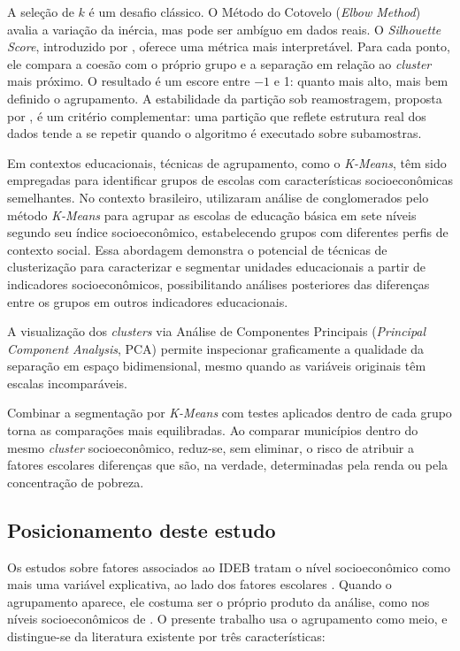 A seleção de $k$ é um desafio clássico. O Método do Cotovelo (\textit{Elbow Method}) avalia a variação da inércia, mas pode ser ambíguo em dados reais. O \textit{Silhouette Score}, introduzido por \citet{rousseeuw1987}, oferece uma métrica mais interpretável. Para cada ponto, ele compara a coesão com o próprio grupo e a separação em relação ao \textit{cluster} mais próximo. O resultado é um escore entre $-1$ e 1: quanto mais alto, mais bem definido o agrupamento. A estabilidade da partição sob reamostragem, proposta por \citet{benhur2002}, é um critério complementar: uma partição que reflete estrutura real dos dados tende a se repetir quando o algoritmo é executado sobre subamostras.

Em contextos educacionais, técnicas de agrupamento, como o \textit{K-Means}, têm sido empregadas para identificar grupos de escolas com características socioeconômicas semelhantes. No contexto brasileiro, \citet{alves2014} utilizaram análise de conglomerados pelo método \textit{K-Means} para agrupar as escolas de educação básica em sete níveis segundo seu índice socioeconômico, estabelecendo grupos com diferentes perfis de contexto social. Essa abordagem demonstra o potencial de técnicas de clusterização para caracterizar e segmentar unidades educacionais a partir de indicadores socioeconômicos, possibilitando análises posteriores das diferenças entre os grupos em outros indicadores educacionais.

A visualização dos \textit{clusters} via Análise de Componentes Principais (\textit{Principal Component Analysis}, PCA) \citep{abdi2010} permite inspecionar graficamente a qualidade da separação em espaço bidimensional, mesmo quando as variáveis originais têm escalas incomparáveis.

Combinar a segmentação por \textit{K-Means} com testes aplicados dentro de cada grupo torna as comparações mais equilibradas. Ao comparar municípios dentro do mesmo \textit{cluster} socioeconômico, reduz-se, sem eliminar, o risco de atribuir a fatores escolares diferenças que são, na verdade, determinadas pela renda ou pela concentração de pobreza.

\subsection{Posicionamento deste estudo}

Os estudos sobre fatores associados ao IDEB tratam o nível socioeconômico como mais uma variável explicativa, ao lado dos fatores escolares \citep{alves2013}. Quando o agrupamento aparece, ele costuma ser o próprio produto da análise, como nos níveis socioeconômicos de \citet{alves2014}. O presente trabalho usa o agrupamento como meio, e distingue-se da literatura existente por três características:

